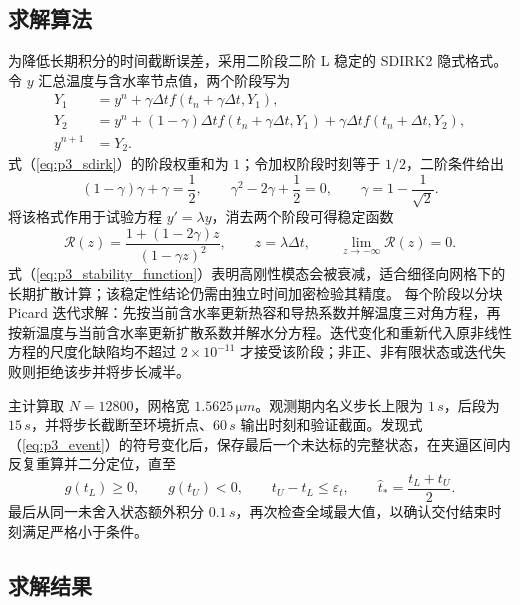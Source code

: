 \documentclass[withoutpreface,bwprint]{cumcmthesis}
\begin{document}
\subsection{求解算法}

为降低长期积分的时间截断误差，采用二阶段二阶 L 稳定的 SDIRK2 隐式格式。令 $y$ 汇总温度与含水率节点值，两个阶段写为
\begin{equation}
\begin{aligned}
Y_1&=y^n+\gamma\Delta t f(t_n+\gamma\Delta t,Y_1),\\
Y_2&=y^n+(1-\gamma)\Delta t f(t_n+\gamma\Delta t,Y_1)
      +\gamma\Delta t f(t_n+\Delta t,Y_2),\\
y^{n+1}&=Y_2.
\end{aligned}
\label{eq:p3_sdirk}
\end{equation}
式（\ref{eq:p3_sdirk}）的阶段权重和为 $1$；令加权阶段时刻等于 $1/2$，二阶条件给出
\begin{equation}
(1-\gamma)\gamma+\gamma=\frac12,\qquad
\gamma^2-2\gamma+\frac12=0,\qquad
\gamma=1-\frac{1}{\sqrt2}.
\label{eq:p3_gamma_derivation}
\end{equation}
将该格式作用于试验方程 $y'=\lambda y$，消去两个阶段可得稳定函数
\begin{equation}
\mathcal R(z)=\frac{1+(1-2\gamma)z}{(1-\gamma z)^2},\qquad
z=\lambda\Delta t,\qquad
\lim_{z\to-\infty}\mathcal R(z)=0.
\label{eq:p3_stability_function}
\end{equation}
式（\ref{eq:p3_stability_function}）表明高刚性模态会被衰减，适合细径向网格下的长期扩散计算；该稳定性结论仍需由独立时间加密检验其精度。
每个阶段以分块 Picard 迭代求解：先按当前含水率更新热容和导热系数并解温度三对角方程，再按新温度与当前含水率更新扩散系数并解水分方程。迭代变化和重新代入原非线性方程的尺度化缺陷均不超过 $2\times10^{-11}$ 才接受该阶段；非正、非有限状态或迭代失败则拒绝该步并将步长减半。

主计算取 $N=12800$，网格宽 $1.5625\,\si{\micro m}$。观测期内名义步长上限为 $1\,\si{s}$，后段为 $15\,\si{s}$，并将步长截断至环境折点、$60\,\si{s}$ 输出时刻和验证截面。发现式（\ref{eq:p3_event}）的符号变化后，保存最后一个未达标的完整状态，在夹逼区间内反复重算并二分定位，直至
\begin{equation}
g(t_L)\ge0,\qquad g(t_U)<0,\qquad
t_U-t_L\le\varepsilon_t,\qquad
\widehat t_*=\frac{t_L+t_U}{2}.
\label{eq:p3_event_bracket}
\end{equation}
最后从同一未舍入状态额外积分 $0.1\,\si{s}$，再次检查全域最大值，以确认交付结束时刻满足严格小于条件。

\subsection{求解结果}
\end{document}

